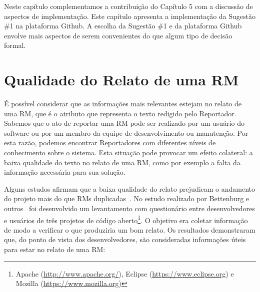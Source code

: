 
Neste capítulo complementamos a contribuição do Capítulo 5 com a discussão de
aspectos de implementação. Este capítulo apresenta a implementação da Sugestão
\#1 na plataforma Github. A escolha da Sugestão \#1 e da plataforma Github
envolve mais aspectos de serem convenientes do que algum tipo de decisão formal.

\section{Qualidade do Relato de uma RM}
\label{sec:avaliando_a_qualidade_do_relato_de_uma_rm}

É possível considerar que as informações mais relevantes estejam no relato de
uma RM, que é o atributo que representa o texto redigido pelo Reportador.
Sabemos que o ato de reportar uma RM pode ser realizado por um usuário do
software ou por um membro da equipe de desenvolvimento ou manutenção. Por esta
razão, podemos encontrar Reportadores com diferentes níveis de conhecimento
sobre o sistema. Esta situação pode provocar um efeito colateral: a baixa
qualidade do texto no relato de uma RM, como por exemplo a falta da informação
necessária para sua solução.

Alguns estudos afirmam que a baixa qualidade do relato prejudicam o andamento do
projeto mais do que RMs duplicadas~\cite{bettenburg2007quality}. No estudo
realizado por Bettenburg e outros~\cite{bettenburg2008makes} foi desenvolvido um
levantamento com questionário entre desenvolvedores e usuários de três projetos
de código aberto\footnote{Apache (\url{http://www.apache.org/}), Eclipse
    (\url{https://www.eclipse.org}) e Mozilla (\url{https://www.mozilla.org})}.
O objetivo era coletar informação de modo a verificar o que produziria um bom
relato. Os resultados demonstraram que, do ponto de vista dos desenvolvedores,
são consideradas informações úteis para estar no relato de uma RM\@:

